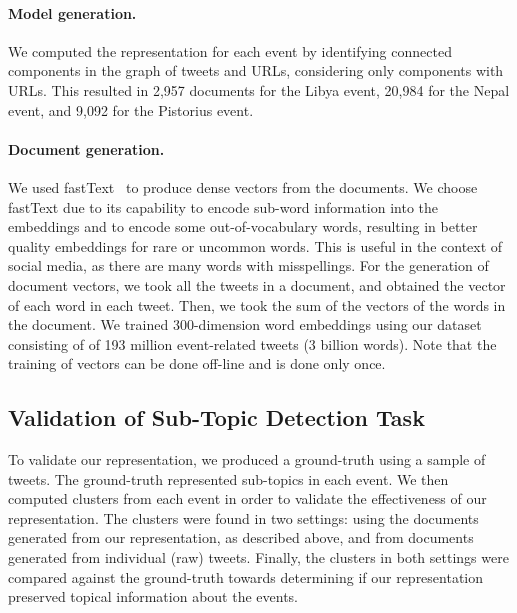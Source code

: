 
\paragraph{Model generation.} 
%
%
We computed the representation for each event by identifying connected
components in the graph of tweets and URLs, considering only components with
URLs.
%
This resulted in 2,957 documents for the Libya event, 20,984 for the Nepal
event, and 9,092 for the Pistorius event.


\paragraph{Document generation.}
%
We used fastText~\cite{bojanowski2017enriching} to produce dense vectors from
the documents.
%
We choose fastText due to its capability to encode sub-word information into the
embeddings and to encode some out-of-vocabulary words, resulting in better
quality embeddings for rare or uncommon words. 
%
This is useful in the context of social media, as there are many words with
misspellings. 
%
For the generation of document vectors, we took all the tweets in a document,
and obtained the vector of each word in each tweet.
%
Then, we took the sum of the vectors of the words in the document.
%
We trained 300-dimension word embeddings using our dataset consisting of of 193
million event-related tweets (3 billion words).
%
Note that the training of vectors can be done off-line and is done only once.


\subsection{Validation of Sub-Topic Detection Task}

To validate our representation, we produced a ground-truth using a sample of
tweets.
%
The ground-truth represented sub-topics in each event. 
%
We then computed clusters from each event in order to validate the effectiveness
of our representation.
%
The clusters were found in two settings: using the documents generated from our
representation, as described above, and from documents generated from individual
(raw) tweets.
%
Finally, the clusters in both settings were compared against the ground-truth
towards determining if our representation preserved topical information about
the events.

